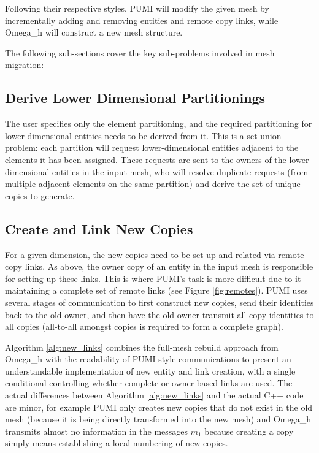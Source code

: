 Following their respective styles, PUMI will modify the given
mesh by incrementally adding and removing entities and remote
copy links,
while Omega\_h will construct a new mesh structure.

The following sub-sections cover the key sub-problems involved
in mesh migration:

\subsection{Derive Lower Dimensional Partitionings}
\label{sec:migr_down}

The user specifies only the element partitioning, and
the required partitioning for lower-dimensional entities needs to
be derived from it.
This is a set union problem: each partition will request lower-dimensional
entities adjacent to the elements it has been assigned.
These requests are sent to the owners of the lower-dimensional entities
in the input mesh, who will resolve duplicate requests (from multiple
adjacent elements on the same partition) and derive the set
of unique copies to generate.

\subsection{Create and Link New Copies}
\label{sec:migr_links}

For a given dimension, the new copies need to be set up
and related via remote copy links.
As above, the owner copy of an entity in the input mesh is responsible
for setting up these links.
This is where PUMI's task is more difficult due to it maintaining
a complete set of remote links (see Figure \ref{fig:remotes}).
PUMI uses several stages of communication to first construct
new copies, send their identities back to the old owner, and then
have the old owner transmit all copy identities to all copies (all-to-all
amongst copies is required to form a complete graph).

Algorithm \ref{alg:new_links} combines the full-mesh rebuild approach
from Omega\_h with the readability of PUMI-style communications to
present an understandable implementation of new entity and link creation,
with a single conditional controlling whether complete or owner-based
links are used.
The actual differences between Algorithm \ref{alg:new_links} and the
actual C++ code are minor, for example PUMI only creates new copies
that do not exist in the old mesh (because it is being directly
transformed into the new mesh) and Omega\_h transmits almost no
information in the messages $m_1$ because creating a copy simply
means establishing a local numbering of new copies.

